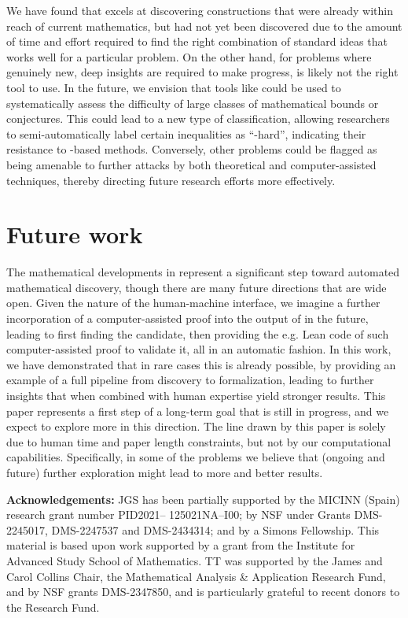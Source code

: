 We have found that \AlphaEvolve excels at discovering constructions that were already  within reach of current mathematics, but had not yet been discovered due to the amount of time and effort required to find the right combination of standard ideas that works well for a particular problem. On the other hand, for problems where genuinely new, deep insights are required to make progress, \AlphaEvolve is likely not the right tool to use. In the future, we envision that tools like \AlphaEvolve could be used to systematically assess the difficulty of large classes of mathematical bounds or conjectures. This could lead to a new type of classification, allowing researchers to semi-automatically label certain inequalities as ``\AlphaEvolve-hard'', indicating their resistance to \AlphaEvolve-based methods. Conversely, other problems could be flagged as being amenable to further attacks by both theoretical and computer-assisted techniques, thereby directing future research efforts more effectively.


\section{Future work}
The mathematical developments in \AlphaEvolve represent a significant step toward automated mathematical discovery, though there are many future directions that are wide open. Given the nature of the human-machine interface, we imagine a further incorporation of a computer-assisted proof into the output of \AlphaEvolve in the future, leading to \AlphaEvolve first finding the candidate, then providing the e.g. Lean code of such computer-assisted proof to validate it, all in an automatic fashion. In this work, we have demonstrated that in rare cases this is already possible, by providing an example of a full pipeline from discovery to formalization, leading to further insights that when combined with human expertise yield stronger results. This paper represents a first step of a long-term goal that is still in progress, and we expect to explore more in this direction. 
The line drawn by this paper is solely due to human time and paper length constraints, but not by our computational capabilities. Specifically, in some of the problems we believe that (ongoing and future) further exploration might lead to more and better results.



\textbf{Acknowledgements:} JGS has been partially supported by the MICINN (Spain) research grant number PID2021–
125021NA–I00; by NSF under Grants DMS-2245017, DMS-2247537 and DMS-2434314; and by a Simons Fellowship. This material is based upon work supported by a grant from the Institute
for Advanced Study School of Mathematics. TT was supported by the James and Carol Collins Chair, the Mathematical Analysis \& Application Research Fund, and by NSF grants DMS-2347850, and is particularly grateful to recent donors to the Research Fund. 



